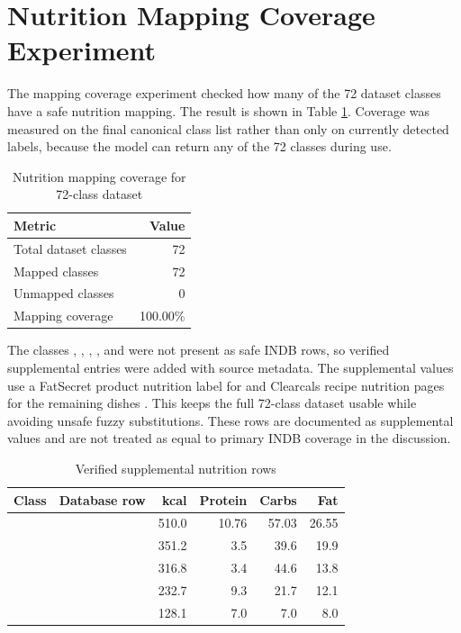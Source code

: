 \section{Nutrition Mapping Coverage Experiment}

The mapping coverage experiment checked how many of the 72 dataset classes have a safe nutrition mapping. The result is shown in Table \ref{tab:mapping-coverage}. Coverage was measured on the final canonical class list rather than only on currently detected labels, because the model can return any of the 72 classes during use.

\begin{table}[H]
\centering
\caption{Nutrition mapping coverage for 72-class dataset}
\label{tab:mapping-coverage}
\begin{tabular}{lr}
\toprule
Metric & Value\\
\midrule
Total dataset classes & 72\\
Mapped classes & 72\\
Unmapped classes & 0\\
Mapping coverage & 100.00\%\\
\bottomrule
\end{tabular}
\end{table}

The classes , , , , and  were not present as safe INDB rows, so verified supplemental entries were added with source metadata. The supplemental values use a FatSecret product nutrition label for  and Clearcals recipe nutrition pages for the remaining dishes \cite{fatsecret_bhakarwadi_2026,clearcals_ghevar_2026,clearcals_jalebi_2026,clearcals_khandvi_2026,clearcals_nandu_kari_2026}. This keeps the full 72-class dataset usable while avoiding unsafe fuzzy substitutions. These rows are documented as supplemental values and are not treated as equal to primary INDB coverage in the discussion.

\begin{table}[H]
\centering
\caption{Verified supplemental nutrition rows}
\label{tab:supplemental-nutrition}
\begingroup
\small
\setlength{\tabcolsep}{3pt}
\begin{tabularx}{\textwidth}{L{0.18\textwidth}Yrrrr}
\toprule
Class & Database row & kcal & Protein & Carbs & Fat\\
\midrule
{} &  & 510.0 & 10.76 & 57.03 & 26.55\\
 &  & 351.2 & 3.5 & 39.6 & 19.9\\
 &  & 316.8 & 3.4 & 44.6 & 13.8\\
 &  & 232.7 & 9.3 & 21.7 & 12.1\\
 &  & 128.1 & 7.0 & 7.0 & 8.0\\
\bottomrule
\end{tabularx}
\endgroup
\end{table}

